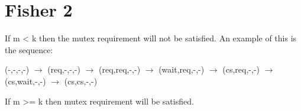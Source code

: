 \section{Fisher 2}
\label{sec:org1637cd2}
If m < k then the mutex requirement will not be satisfied. An example of this is the sequence:

(-,-,-,-) $\rightarrow$ (req,-,-,-) $\rightarrow$ (req,req,-,-) $\rightarrow$ (wait,req,-,-) $\rightarrow$ (cs,req,-,-) $\rightarrow$ (cs,wait,-,-) $\rightarrow$ (cs,cs,-,-)

If m  \textgreater= k then mutex requirement will be satisfied.

 
